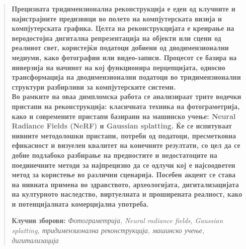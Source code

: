 \newpage
{}
\setcounter{page}{2}

\renewcommand{\abstractname}{\large Апстракт}


\begin{abstract}
\fontsize{12pt}{15pt}\selectfont
    \textbf{Прецизната тридимензионална реконструкција е еден од клучните и најистрајните предизвици во полето на компјутерската визија и компјутерската графика. Целта на реконструкцијата е креирање на веродостојна дигитална репрезентација на објекти или сцени од реалниот свет, користејќи податоци добиени од дводимензионални медиуми, како фотографии или видео-записи. Процесот се базира на инверзија на начинот на кој функционира перцепцијата, односно трансформација на дводимензионални податоци во тридимензионални структури разбирливи за компјутерските системи.
    \\
    Во рамките на оваа димпломска работа се анализираат трите водечки пристапи на реконструкција: класичната техника на фотограметрија, како и современите пристапи базирани на машинско учење: Neural Radiance Fields (NeRF) и Gaussian splatting. Ќе се испитуваат нивните методолошки пристапи, потреби од податоци, пресметковна ефикасност и визуелен квалитет на конечните резултати, со цел да се добие подлабоко разбирање на предностите и недостатоците на поединечните методи за најпрецизно да се одлучи кој е најсоодветен метод за користење во различни сценарија. Посебен акцент се става на нивната примена во здравството, археологијата, дигитализацијата на културното наследство, виртуелната и проширената реалност, како и потенцијалната комерцијална употреба.}

    
\fontsize{10pt}{12pt}\selectfont
    \textbf{Клучни зборови:} \textit{Фотограметрија, Neural radiance fields, Gaussian splatting, тридимензионална реконструкција, машинско учење, дигитализација}
\end{abstract}
